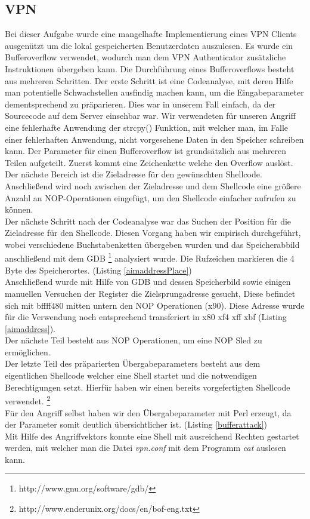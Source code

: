 \documentclass[12pt]{article}
\begin{document}
\subsection{VPN}
Bei dieser Aufgabe wurde eine mangelhafte Implementierung eines VPN Clients ausgenützt um die lokal gespeicherten Benutzerdaten auszulesen. Es wurde ein Bufferoverflow verwendet, wodurch man dem VPN Authenticator zusätzliche Instruktionen übergeben kann. Die Durchführung eines Bufferoverflows besteht aus mehreren Schritten. Der erste Schritt ist eine Codeanalyse, mit deren Hilfe man potentielle Schwachstellen ausfindig machen kann, um die Eingabeparameter dementsprechend zu präparieren. Dies war in unserem Fall einfach, da der Sourcecode auf dem Server einsehbar war. Wir verwendeten für unseren Angriff eine fehlerhafte Anwendung der strcpy() Funktion, mit welcher man, im Falle einer fehlerhaften Anwendung, nicht vorgesehene Daten in den Speicher schreiben kann. Der Parameter für einen Bufferoverflow ist grundsätzlich aus mehreren Teilen aufgeteilt. Zuerst kommt eine Zeichenkette welche den Overflow auslöst. Der nächste Bereich ist die Zieladresse für den gewünschten Shellcode. Anschließend wird noch zwischen der Zieladresse und dem Shellcode eine größere Anzahl an NOP-Operationen eingefügt, um den Shellcode einfacher aufrufen zu können.\\
Der nächste Schritt nach der Codeanalyse war das Suchen der Position für die Zieladresse für den Shellcode. Diesen Vorgang haben wir empirisch durchgeführt, wobei verschiedene Buchstabenketten übergeben wurden und das Speicherabbild anschließend mit dem GDB \footnote{http://www.gnu.org/software/gdb/} analysiert wurde. Die Rufzeichen markieren die 4 Byte des Speicherortes. (Listing \ref{aimaddressPlace}) \\
Anschließend wurde mit Hilfe von GDB und dessen Speicherbild sowie einigen manuellen Versuchen der Register die Zielsprungadresse gesucht, Diese befindet sich mit bffff480 mitten untern den NOP Operationen (x90). Diese Adresse wurde für die Verwendung noch entsprechend transferiert in x80 xf4 xff xbf (Listing \ref{aimaddress}). \\
Der nächste Teil besteht aus NOP Operationen, um eine NOP Sled zu ermöglichen. \\
Der letzte Teil des präparierten Übergabeparameters besteht aus dem eigentlichen Shellcode welcher eine Shell startet und die notwendigen Berechtigungen setzt. Hierfür haben wir einen bereits vorgefertigten Shellcode verwendet. \footnote{http://www.enderunix.org/docs/en/bof-eng.txt} \\
Für den Angriff selbst haben wir den Übergabeparameter mit Perl erzeugt, da der Parameter somit deutlich übersichtlicher ist. (Listing \ref{bufferattack}) \\ 
Mit Hilfe des Angriffvektors konnte eine Shell mit ausreichend Rechten gestartet werden, mit welcher man die Datei \emph{vpn.conf} mit dem Programm \emph{cat} auslesen kann.
\end{document}
